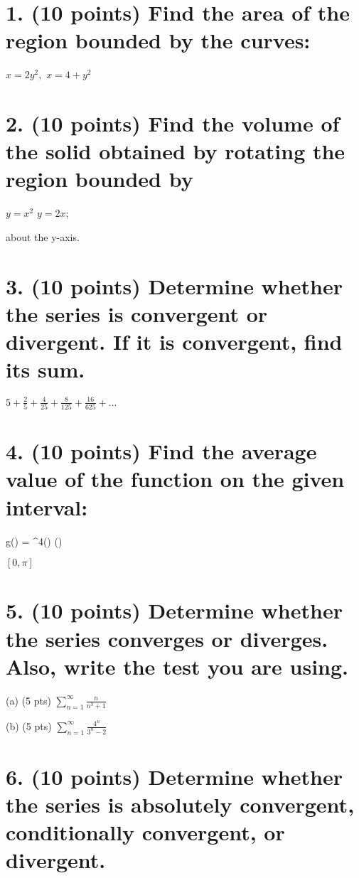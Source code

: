 \section*{1. (10 points) Find the area of the region bounded by the curves:}

$x=2y^{2}, $ $x=4+y^{2}$  

\newpage

\section*{2. (10 points) Find the volume of the solid obtained by rotating the region bounded by}

$y=x^{2}$ $y=2x$;

about the y-axis.

\newpage

\section*{3. (10 points) Determine whether the series is convergent or divergent. If it is convergent, find its sum.}

$5+\frac{2}{5}+\frac{4}{25}+\frac{8}{125}+\frac{16}{625}+...$ 

\newpage

\section*{4. (10 points) Find the average value of the function on the given interval:}

g(\theta) = \cos^4(\theta) \sin(\theta)

$[0,\pi]$ 

\newpage

\section*{5. (10 points) Determine whether the series converges or diverges. Also, write the test you are using.}

(a) (5 pts) $\sum_{n=1}^{\infty}\frac{n}{n^{3}+1}$  

(b) (5 pts) $\sum_{n=1}^{\infty}\frac{4^{n}}{3^{n}-2}$  

\newpage

\section*{6. (10 points) Determine whether the series is absolutely convergent, conditionally convergent, or divergent.}

